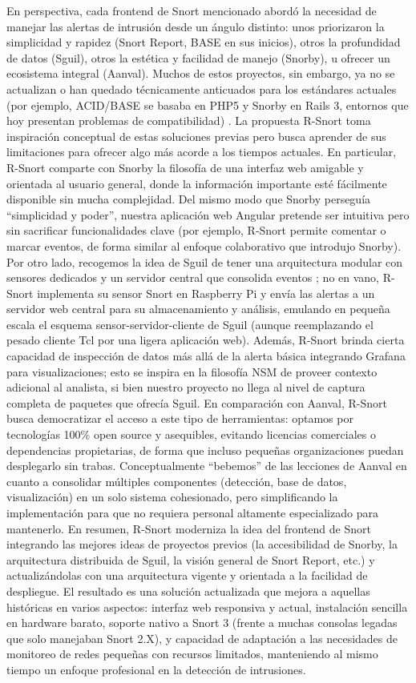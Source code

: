 \documentclass[11pt,a4paper,twoside]{report}
\begin{document}
En perspectiva, cada frontend de Snort mencionado abordó la necesidad de manejar las alertas de intrusión desde un ángulo distinto: unos priorizaron la simplicidad y rapidez (Snort Report, BASE en sus inicios), otros la profundidad de datos (Sguil), otros la estética y facilidad de manejo (Snorby), u ofrecer un ecosistema integral (Aanval). Muchos de estos proyectos, sin embargo, ya no se actualizan o han quedado técnicamente anticuados para los estándares actuales (por ejemplo, ACID/BASE se basaba en PHP5 y Snorby en Rails 3, entornos que hoy presentan problemas de compatibilidad) \cite{StackExchange2011}. La propuesta R-Snort toma inspiración conceptual de estas soluciones previas pero busca aprender de sus limitaciones para ofrecer algo más acorde a los tiempos actuales. En particular, R-Snort comparte con Snorby la filosofía de una interfaz web amigable y orientada al usuario general, donde la información importante esté fácilmente disponible sin mucha complejidad. Del mismo modo que Snorby perseguía “simplicidad y poder”, nuestra aplicación web Angular pretende ser intuitiva pero sin sacrificar funcionalidades clave (por ejemplo, R-Snort permite comentar o marcar eventos, de forma similar al enfoque colaborativo que introdujo Snorby). Por otro lado, recogemos la idea de Sguil de tener una arquitectura modular con sensores dedicados y un servidor central que consolida eventos \cite{sectoolsSguil}; no en vano, R-Snort implementa su sensor Snort en Raspberry Pi y envía las alertas a un servidor web central para su almacenamiento y análisis, emulando en pequeña escala el esquema sensor-servidor-cliente de Sguil (aunque reemplazando el pesado cliente Tcl por una ligera aplicación web). Además, R-Snort brinda cierta capacidad de inspección de datos más allá de la alerta básica integrando Grafana para visualizaciones; esto se inspira en la filosofía NSM de proveer contexto adicional al analista, si bien nuestro proyecto no llega al nivel de captura completa de paquetes que ofrecía Sguil. En comparación con Aanval, R-Snort busca democratizar el acceso a este tipo de herramientas: optamos por tecnologías 100\% open source y asequibles, evitando licencias comerciales o dependencias propietarias, de forma que incluso pequeñas organizaciones puedan desplegarlo sin trabas. Conceptualmente “bebemos” de las lecciones de Aanval en cuanto a consolidar múltiples componentes (detección, base de datos, visualización) en un solo sistema cohesionado, pero simplificando la implementación para que no requiera personal altamente especializado para mantenerlo. En resumen, R-Snort moderniza la idea del frontend de Snort integrando las mejores ideas de proyectos previos (la accesibilidad de Snorby, la arquitectura distribuida de Sguil, la visión general de Snort Report, etc.) y actualizándolas con una arquitectura vigente y orientada a la facilidad de despliegue. El resultado es una solución actualizada que mejora a aquellas históricas en varios aspectos: interfaz web responsiva y actual, instalación sencilla en hardware barato, soporte nativo a Snort 3 (frente a muchas consolas legadas que solo manejaban Snort 2.X), y capacidad de adaptación a las necesidades de monitoreo de redes pequeñas con recursos limitados, manteniendo al mismo tiempo un enfoque profesional en la detección de intrusiones.
\end{document}
